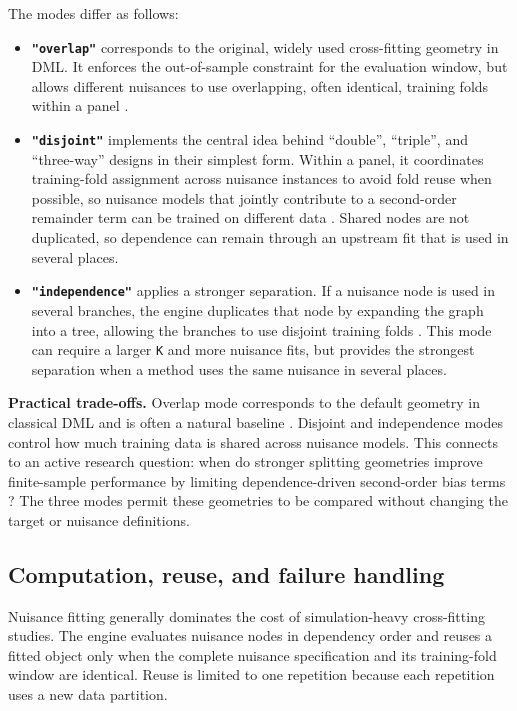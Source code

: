 The modes differ as follows:

\begin{itemize}
\tightlist
\item
  \textbf{\texttt{"overlap"}} corresponds to the original, widely used cross-fitting geometry in DML. It enforces the out-of-sample constraint for the evaluation window, but allows different nuisances to use overlapping, often identical, training folds within a panel \citep{chernozhukov2018, newey2018}.
\item
  \textbf{\texttt{"disjoint"}} implements the central idea behind ``double'', ``triple'', and ``three-way'' designs in their simplest form. Within a panel, it coordinates training-fold assignment across nuisance instances to avoid fold reuse when possible, so nuisance models that jointly contribute to a second-order remainder term can be trained on different data \citep{mcclean2024, fisher2023, ke2024}. Shared nodes are not duplicated, so dependence can remain through an upstream fit that is used in several places.
\item
  \textbf{\texttt{"independence"}} applies a stronger separation. If a nuisance node is used in several branches, the engine duplicates that node by expanding the graph into a tree, allowing the branches to use disjoint training folds \citep{chiang2022}. This mode can require a larger \texttt{K} and more nuisance fits, but provides the strongest separation when a method uses the same nuisance in several places.
\end{itemize}

\textbf{Practical trade-offs.} Overlap mode corresponds to the default geometry in classical DML and is often a natural baseline \citep{chernozhukov2018}. Disjoint and independence modes control how much training data is shared across nuisance models. This connects to an active research question: when do stronger splitting geometries improve finite-sample performance by limiting dependence-driven second-order bias terms \citep{mcclean2024, fisher2023, ke2024, chiang2022, zivich2021}? The three modes permit these geometries to be compared without changing the target or nuisance definitions.

\subsection{Computation, reuse, and failure handling}\label{subsec:performance}

Nuisance fitting generally dominates the cost of simulation-heavy cross-fitting studies. The engine evaluates nuisance nodes in dependency order and reuses a fitted object only when the complete nuisance specification and its training-fold window are identical. Reuse is limited to one repetition because each repetition uses a new data partition.

